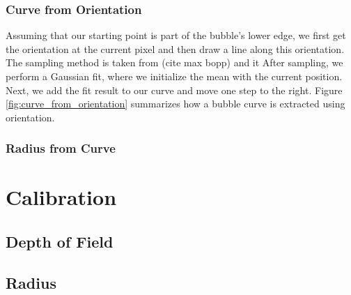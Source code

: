 	
	
	
	
	
	
			\subsubsection{Curve from Orientation}
				Assuming that our starting point is part of the bubble's lower edge, we first get the orientation at the current pixel and then draw a line along this orientation. The sampling method is taken from (cite max bopp) and it 
				 After sampling, we perform a Gaussian fit, where we initialize the mean with the current position. Next, we add the fit result to our curve and move one step to the right. Figure \ref{fig:curve_from_orientation} summarizes how a bubble curve is extracted using orientation. 
				
				
			\subsubsection{Radius from Curve}
	
	
	
	
	\section{Calibration}\label{calibration_algorithm}
		\subsection{Depth of Field}
		\subsection{Radius}\label{sub:radius_algorithm}
